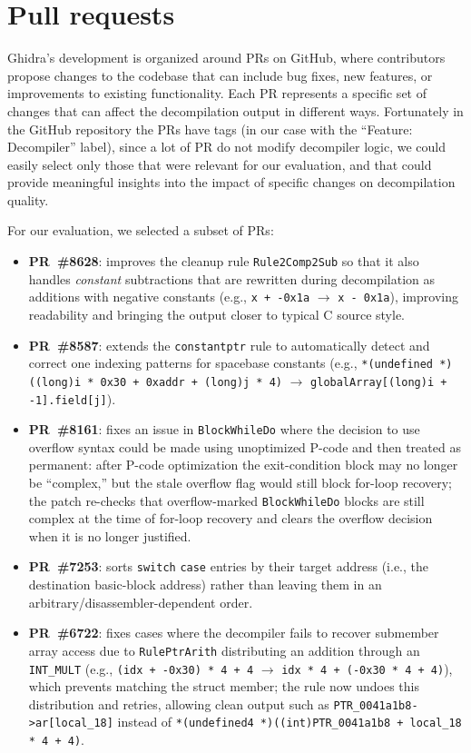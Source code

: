 \section{Pull requests}

Ghidra's development is organized around \acp{PR} on GitHub, where contributors propose changes to the codebase that can include bug fixes, new features, or improvements to existing functionality. Each \ac{PR} represents a specific set of changes that can affect the decompilation output in different ways.
Fortunately in the GitHub repository the \acp{PR} have tags (in our case with the ``Feature: Decompiler'' label), since a lot of \ac{PR} do not modify decompiler logic, we could easily select only those that were relevant for our evaluation, and that could provide meaningful insights into the impact of specific changes on decompilation quality.

For our evaluation, we selected a subset of PRs:
\begin{itemize}
\item \textbf{\ac{PR}~\#8628}: improves the cleanup rule \texttt{Rule2Comp2Sub} so that it also handles \emph{constant} subtractions that are rewritten during decompilation as additions with negative constants (e.g., \texttt{x + -0x1a} $\rightarrow$ \texttt{x - 0x1a}), improving readability and bringing the output closer to typical C source style.
\item \textbf{\ac{PR}~\#8587}: extends the \texttt{constantptr} rule to automatically detect and correct one indexing patterns for spacebase constants (e.g., \texttt{*(undefined *) ((long)i * 0x30 + 0xaddr + (long)j * 4)} $\rightarrow$ \texttt{globalArray[(long)i + -1].field[j]}). 
\item \textbf{\ac{PR}~\#8161}: fixes an issue in \texttt{BlockWhileDo} where the decision to use overflow syntax could be made using unoptimized P-code and then treated as permanent: after P-code optimization the exit-condition block may no longer be ``complex,'' but the stale overflow flag would still block for-loop recovery; the patch re-checks that overflow-marked \texttt{BlockWhileDo} blocks are still complex at the time of for-loop recovery and clears the overflow decision when it is no longer justified.
\item \textbf{\ac{PR}~\#7253}: sorts \texttt{switch} \texttt{case} entries by their target address (i.e., the destination basic-block address) rather than leaving them in an arbitrary/disassembler-dependent order.
\item \textbf{\ac{PR}~\#6722}: fixes cases where the decompiler fails to recover submember array access due to \texttt{RulePtrArith} distributing an addition through an \texttt{INT\_MULT} (e.g., \texttt{(idx + -0x30) * 4 + 4} $\rightarrow$ \texttt{idx * 4 + (-0x30 * 4 + 4)}), which prevents matching the struct member; the rule now undoes this distribution and retries, allowing clean output such as \texttt{PTR\_0041a1b8->ar[local\_18]} instead of \texttt{*(undefined4 *)((int)PTR\_0041a1b8 + local\_18 * 4 + 4)}.
\end{itemize}

